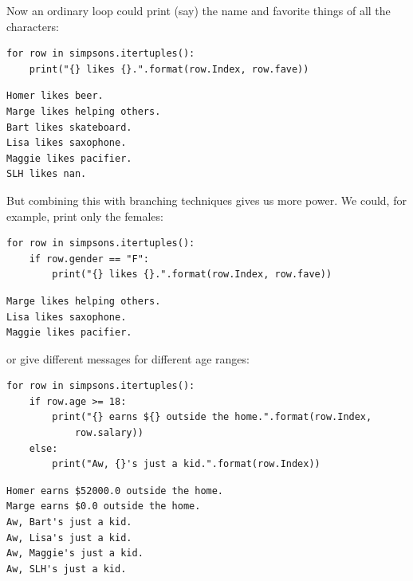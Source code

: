 Now an ordinary loop could print (say) the name and favorite things of all the
characters:


\begin{Verbatim}[fontsize=\footnotesize,samepage=true,frame=single,framesep=3mm]
for row in simpsons.itertuples():
    print("{} likes {}.".format(row.Index, row.fave))
\end{Verbatim}
\vspace{-.2in}

\begin{Verbatim}[fontsize=\footnotesize,samepage=true,frame=leftline,framesep=5mm,framerule=1mm]
Homer likes beer.
Marge likes helping others.
Bart likes skateboard.
Lisa likes saxophone.
Maggie likes pacifier.
SLH likes nan.
\end{Verbatim}

But combining this with branching techniques gives us more power. We could, for
example, print only the females:

\begin{Verbatim}[fontsize=\CBCodeSmall,samepage=true,frame=single,framesep=3mm]
for row in simpsons.itertuples():
    if row.gender == "F":
        print("{} likes {}.".format(row.Index, row.fave))
\end{Verbatim}
\vspace{-.2in}

\begin{Verbatim}[fontsize=\CBCodeSmall,samepage=true,frame=leftline,framesep=5mm,framerule=1mm]
Marge likes helping others.
Lisa likes saxophone.
Maggie likes pacifier.
\end{Verbatim}

or give different messages for different age ranges:

\begin{Verbatim}[fontsize=\CBCodeSmall,samepage=true,frame=single,framesep=3mm]
for row in simpsons.itertuples():
    if row.age >= 18:
        print("{} earns ${} outside the home.".format(row.Index,
            row.salary))
    else:
        print("Aw, {}'s just a kid.".format(row.Index))
\end{Verbatim}
\vspace{-.2in}

\begin{Verbatim}[fontsize=\CBCodeSmall,samepage=true,frame=leftline,framesep=5mm,framerule=1mm]
Homer earns $52000.0 outside the home.
Marge earns $0.0 outside the home.
Aw, Bart's just a kid.
Aw, Lisa's just a kid.
Aw, Maggie's just a kid.
Aw, SLH's just a kid.
\end{Verbatim}

